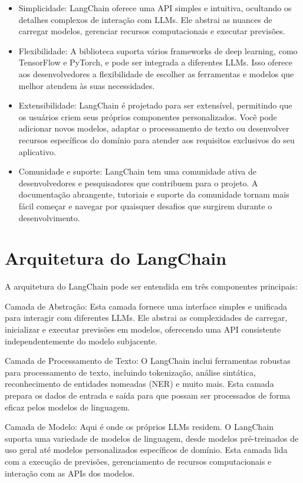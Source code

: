 \documentclass[14pt,a4paper,oneside]{book}
\begin{document}
\begin{itemize}
    \item Simplicidade: LangChain oferece uma API simples e intuitiva, ocultando os detalhes complexos de interação com LLMs. Ele abstrai as nuances de carregar modelos, gerenciar recursos computacionais e executar previsões.
    
    \item Flexibilidade: A biblioteca suporta vários frameworks de deep learning, como TensorFlow e PyTorch, e pode ser integrada a diferentes LLMs. Isso oferece aos desenvolvedores a flexibilidade de escolher as ferramentas e modelos que melhor atendem às suas necessidades.
    
    \item Extensibilidade: LangChain é projetado para ser extensível, permitindo que os usuários criem seus próprios componentes personalizados. Você pode adicionar novos modelos, adaptar o processamento de texto ou desenvolver recursos específicos do domínio para atender aos requisitos exclusivos do seu aplicativo.
    
    \item Comunidade e suporte: LangChain tem uma comunidade ativa de desenvolvedores e pesquisadores que contribuem para o projeto. A documentação abrangente, tutoriais e suporte da comunidade tornam mais fácil começar e navegar por quaisquer desafios que surgirem durante o desenvolvimento.
    
\end{itemize}
\section{Arquitetura do LangChain}

A arquitetura do LangChain pode ser entendida em três componentes principais:

Camada de Abstração: Esta camada fornece uma interface simples e unificada para interagir com diferentes LLMs. Ele abstrai as complexidades de carregar, inicializar e executar previsões em modelos, oferecendo uma API consistente independentemente do modelo subjacente.

Camada de Processamento de Texto: O LangChain inclui ferramentas robustas para processamento de texto, incluindo tokenização, análise sintática, reconhecimento de entidades nomeadas (NER) e muito mais. Esta camada prepara os dados de entrada e saída para que possam ser processados de forma eficaz pelos modelos de linguagem.

Camada de Modelo: Aqui é onde os próprios LLMs residem. O LangChain suporta uma variedade de modelos de linguagem, desde modelos pré-treinados de uso geral até modelos personalizados específicos de domínio. Esta camada lida com a execução de previsões, gerenciamento de recursos computacionais e interação com as APIs dos modelos.
\end{document}
